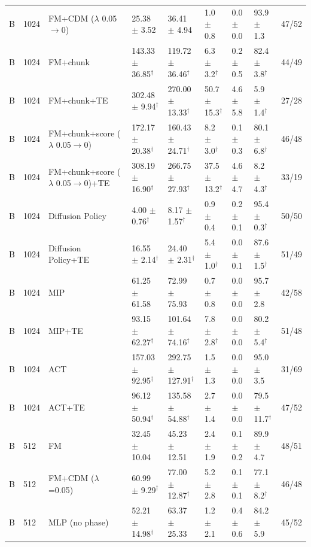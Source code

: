 \begin{tabular}{lllllllll}
B & 1024 & FM+CDM ($\lambda$ 0.05$\to$0) & 25.38 $\pm$ 3.52 & 36.41 $\pm$ 4.94 & 1.0 $\pm$ 0.8 & 0.0 $\pm$ 0.0 & 93.9 $\pm$ 1.3 & 47/52 \\
B & 1024 & FM+chunk & 143.33 $\pm$ 36.85$^\dagger$ & 119.72 $\pm$ 36.46$^\dagger$ & 6.3 $\pm$ 3.2$^\dagger$ & 0.2 $\pm$ 0.5 & 82.4 $\pm$ 3.8$^\dagger$ & 44/49 \\
B & 1024 & FM+chunk+TE & 302.48 $\pm$ 9.94$^\dagger$ & 270.00 $\pm$ 13.33$^\dagger$ & 50.7 $\pm$ 15.3$^\dagger$ & 4.6 $\pm$ 5.8 & 5.9 $\pm$ 1.4$^\dagger$ & 27/28 \\
B & 1024 & FM+chunk+score ($\lambda$ 0.05$\to$0) & 172.17 $\pm$ 20.38$^\dagger$ & 160.43 $\pm$ 24.71$^\dagger$ & 8.2 $\pm$ 3.0$^\dagger$ & 0.1 $\pm$ 0.3 & 80.1 $\pm$ 6.8$^\dagger$ & 46/48 \\
B & 1024 & FM+chunk+score ($\lambda$ 0.05$\to$0)+TE & 308.19 $\pm$ 16.90$^\dagger$ & 266.75 $\pm$ 27.93$^\dagger$ & 37.5 $\pm$ 13.2$^\dagger$ & 4.6 $\pm$ 4.7 & 8.2 $\pm$ 4.3$^\dagger$ & 33/19 \\
B & 1024 & Diffusion Policy & 4.00 $\pm$ 0.76$^\dagger$ & 8.17 $\pm$ 1.57$^\dagger$ & 0.9 $\pm$ 0.4 & 0.2 $\pm$ 0.1 & 95.4 $\pm$ 0.3$^\dagger$ & 50/50 \\
B & 1024 & Diffusion Policy+TE & 16.55 $\pm$ 2.14$^\dagger$ & 24.40 $\pm$ 2.31$^\dagger$ & 5.4 $\pm$ 1.0$^\dagger$ & 0.0 $\pm$ 0.1 & 87.6 $\pm$ 1.5$^\dagger$ & 51/49 \\
B & 1024 & MIP & 61.25 $\pm$ 61.58 & 72.99 $\pm$ 75.93 & 0.7 $\pm$ 0.8 & 0.0 $\pm$ 0.0 & 95.7 $\pm$ 2.8 & 42/58 \\
B & 1024 & MIP+TE & 93.15 $\pm$ 62.27$^\dagger$ & 101.64 $\pm$ 74.16$^\dagger$ & 7.8 $\pm$ 2.8$^\dagger$ & 0.0 $\pm$ 0.0 & 80.2 $\pm$ 5.4$^\dagger$ & 51/48 \\
B & 1024 & ACT & 157.03 $\pm$ 92.95$^\dagger$ & 292.75 $\pm$ 127.91$^\dagger$ & 1.5 $\pm$ 1.3 & 0.0 $\pm$ 0.0 & 95.0 $\pm$ 3.5 & 31/69 \\
B & 1024 & ACT+TE & 96.12 $\pm$ 50.94$^\dagger$ & 135.58 $\pm$ 54.88$^\dagger$ & 2.7 $\pm$ 1.4 & 0.0 $\pm$ 0.0 & 79.5 $\pm$ 11.7$^\dagger$ & 47/52 \\
B & 512 & FM & 32.45 $\pm$ 10.04 & 45.23 $\pm$ 12.51 & 2.4 $\pm$ 1.9 & 0.1 $\pm$ 0.2 & 89.9 $\pm$ 4.7 & 48/51 \\
B & 512 & FM+CDM ($\lambda$=0.05) & 60.99 $\pm$ 9.29$^\dagger$ & 77.00 $\pm$ 12.87$^\dagger$ & 5.2 $\pm$ 2.8 & 0.1 $\pm$ 0.1 & 77.1 $\pm$ 8.2$^\dagger$ & 46/48 \\
B & 512 & MLP (no phase) & 52.21 $\pm$ 14.98$^\dagger$ & 63.37 $\pm$ 25.33 & 1.2 $\pm$ 2.1 & 0.4 $\pm$ 0.6 & 84.2 $\pm$ 5.9 & 45/52 \\

\end{tabular}

